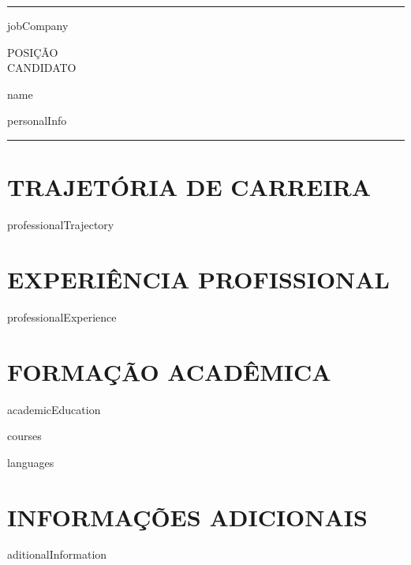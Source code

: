 \documentclass[10.5pt, a4paper]{report}
\begin{document}
\rule{\textwidth}{0.1pt}\vspace{-10pt}

{{jobCompany}}

\begin{minipage}[t]{0.3\textwidth}
  POSIÇÃO \\
  CANDIDATO
\end{minipage}%
{{ name }}

\vspace{5pt}

{{ personalInfo }}

\vspace{-5pt}
\rule{\textwidth}{0.1pt}\vspace{-10pt}

\section{TRAJETÓRIA DE CARREIRA}

{{ professionalTrajectory }}


\section{EXPERIÊNCIA PROFISSIONAL}

{{professionalExperience}}

\section{FORMAÇÃO ACADÊMICA}

{{academicEducation}}

{{ courses }}

{{ languages }}


\section{INFORMAÇÕES ADICIONAIS}
{{ aditionalInformation }}
\end{document}
